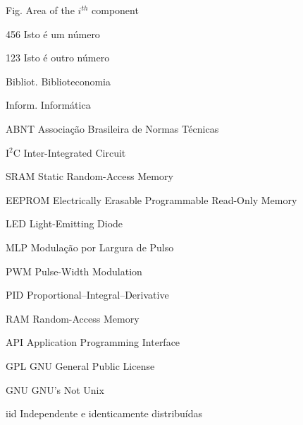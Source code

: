 \begin{siglas}
\item[Fig.] Area of the $i^{th}$ component
\item[456] Isto é um número
\item[123] Isto é outro número
\item [Bibliot.] Biblioteconomia
\item [Inform.]  Informática
\item [ABNT] Associação Brasileira de Normas Técnicas
\item [I$^2$C] Inter-Integrated Circuit
\item [SRAM] Static Random-Access Memory
\item [EEPROM]  Electrically Erasable Programmable Read-Only Memory
\item [LED] Light-Emitting Diode
\item [MLP] Modulação por Largura de Pulso
\item [PWM] Pulse-Width Modulation
\item [PID] Proportional–Integral–Derivative
\item [RAM] Random-Access Memory
\item [API] Application Programming Interface
\item [GPL] GNU General Public License
\item [GNU] GNU's Not Unix
\item [iid] Independente e identicamente distribuídas
\end{siglas}